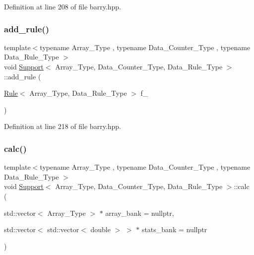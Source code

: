 Definition at line 208 of file barry.\+hpp.

\mbox{\label{classbarry_1_1_support_aa817cb5d6c48dda3ecfeef2c5897b537}} 
\subsubsection{\texorpdfstring{add\+\_\+rule()}{add\_rule()}\hspace{0.1cm}{\footnotesize\ttfamily [2/2]}}
{\footnotesize\ttfamily template$<$typename Array\+\_\+\+Type , typename Data\+\_\+\+Counter\+\_\+\+Type , typename Data\+\_\+\+Rule\+\_\+\+Type $>$ \\
void \hyperlink{classbarry_1_1_support}{Support}$<$ Array\+\_\+\+Type, Data\+\_\+\+Counter\+\_\+\+Type, Data\+\_\+\+Rule\+\_\+\+Type $>$\+::add\+\_\+rule (\begin{DoxyParamCaption}\item[{\hyperlink{classbarry_1_1_rule}{Rule}$<$ Array\+\_\+\+Type, Data\+\_\+\+Rule\+\_\+\+Type $>$}]{f\+\_\+ }\end{DoxyParamCaption})\hspace{0.3cm}{\ttfamily [inline]}}



Definition at line 218 of file barry.\+hpp.

\mbox{\label{classbarry_1_1_support_afa36b8c1348e28c51296379157f58081}} 
\subsubsection{\texorpdfstring{calc()}{calc()}}
{\footnotesize\ttfamily template$<$typename Array\+\_\+\+Type , typename Data\+\_\+\+Counter\+\_\+\+Type , typename Data\+\_\+\+Rule\+\_\+\+Type $>$ \\
void \hyperlink{classbarry_1_1_support}{Support}$<$ Array\+\_\+\+Type, Data\+\_\+\+Counter\+\_\+\+Type, Data\+\_\+\+Rule\+\_\+\+Type $>$\+::calc (\begin{DoxyParamCaption}\item[{std\+::vector$<$ Array\+\_\+\+Type $>$ $\ast$}]{array\+\_\+bank = {\ttfamily nullptr},  }\item[{std\+::vector$<$ std\+::vector$<$ double $>$ $>$ $\ast$}]{stats\+\_\+bank = {\ttfamily nullptr} }\end{DoxyParamCaption})\hspace{0.3cm}{\ttfamily [inline]}}



